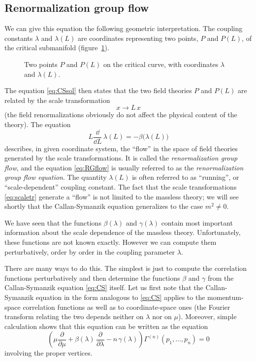 \subsection*{Renormalization group flow}

We can give this equation the following geometric interpretation. The coupling
constants $\lambda$ and $\lambda(L)$ are coordinates representing two points, $P$
and $P(L)$, of the critical submanifold (figure~\ref{fig:flowpoints}).
\begin{figure}[ht]
\centering{}
\caption{Two points $P$ and $P(L)$ on the critical curve, with coordinates
$\lambda$ and $\lambda(L)$.}
\label{fig:flowpoints}
\end{figure}
The equation \eqref{eq:CSsol} then states that the two field theories $P$ and
$P(L)$ are related by the scale transformation
\begin{equation}\label{eq:scaletr}
x\to L\,x
\end{equation}
(the field renormalizations obviously do not affect the physical content of the
theory). The equation
\begin{equation}\label{eq:RGflow}
L\frac{\dd}{\dd L}\,\lambda(L)=-\beta\bigl(\lambda(L)\bigr)
\end{equation}
describes, in given coordinate system, the ``flow'' in the space of field
theories generated by the scale transformations. It is called the
\emph{renormalization group flow}, and the equation \eqref{eq:RGflow} is usually
referred to as the \emph{renormalization group flow equation}. The quantity
$\lambda(L)$ is often referred to as ``running'', or ``scale-dependent'' coupling
constant. The fact that the scale transformations \eqref{eq:scaletr} generate a
``flow'' is not limited to the massless theory; we will see shortly that the
Callan-Symanzik equation generalizes to the case $m^2\neq0$.

We have seen that the functions $\beta(\lambda)$ and $\gamma(\lambda)$ contain
most important information about the scale dependence of the massless theory.
Unfortunately, these functions are not known exactly. However we can compute them
perturbatively, order by order in the coupling parameter $\lambda$.

There are many ways to do this. The simplest is just to compute the correlation
functions perturbatively and then determine the functions $\beta$ and $\gamma$
from the Callan-Symanzik equation \eqref{eq:CS} itself. Let us first note that the
Callan-Symanzik equation in the form analogous to \eqref{eq:CS} applies to the
momentum-space correlation functions as well as to coordinate-space ones (the
Fourier transform relating the two depends neither on $\lambda$ nor on $\mu$).
Moreover, simple calculation shows that this equation can be written as the
equation
\begin{equation}\label{eq:CSGamma}
\left(\mu\frac\partial{\partial\mu}+\beta(\lambda)\,\frac\partial{\partial\lambda}-n\,\gamma(\lambda)\right)\Gamma^{(n)}(p_1,\dots,p_n)=0
\end{equation}
involving the proper vertices.

